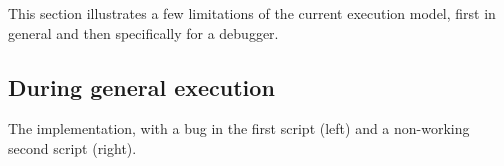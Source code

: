 \documentclass[../main]{subfiles}
\begin{document}
This section illustrates a few limitations of the current execution model, first in general and then specifically for a debugger.

\subsection{During general execution}\label{subsec:in-general}

\begin{listing}
    \centering
    \begin{scratch}[scale=0.6]
    \end{scratch}
    \hspace{3em}
    \begin{scratch}[scale=0.6]
    \end{scratch}
    \caption{The implementation, with a bug in the first script (left) and a non-working second script (right).}
    \label{lst:star-model-implementation}
\end{listing}
\end{document}

